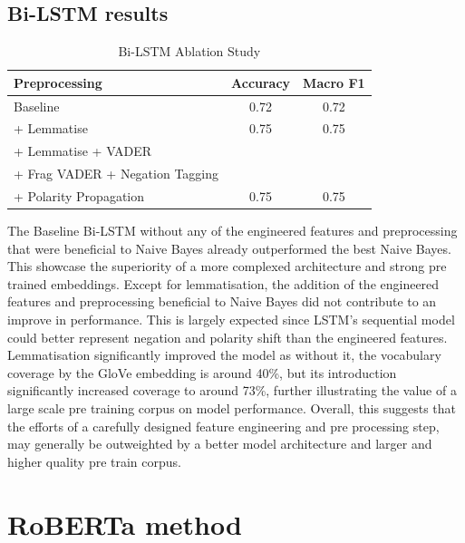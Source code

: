 \documentclass[11pt]{article}
\begin{document}
\subsection{Bi-LSTM results}

\begin{table}[h]
\centering
\small
\renewcommand{\arraystretch}{1.2}
\begin{tabular}{p{4.5cm} c c}
\hline
\textbf{Preprocessing} & \textbf{Accuracy} & \textbf{Macro F1} \\
\hline
Baseline & 0.72 & 0.72 \\
\hline
+ Lemmatise                 & 0.75 & 0.75 \\
\hline
+ Lemmatise + VADER         &      & \\
\quad + Frag VADER + Negation Tagging      &      & \\
\quad + Polarity Propagation                 & 0.75 & 0.75 \\
\hline
\end{tabular}
\caption{Bi-LSTM Ablation Study}
\label{tab:lstm_ablation} 
\end{table}

The Baseline Bi-LSTM without any of the engineered features and preprocessing that were beneficial to Naive Bayes already outperformed the best Naive Bayes.
This showcase the superiority of a more complexed architecture and strong pre trained embeddings. Except for lemmatisation, the addition of the engineered features and preprocessing
beneficial to Naive Bayes did not contribute to an improve in performance. This is largely expected since LSTM's sequential model could better represent negation and polarity shift than the engineered features.
Lemmatisation significantly improved the model as without it, the vocabulary coverage by the GloVe embedding is around 40\%, but its introduction significantly increased coverage to around 73\%, further illustrating the value of a large scale pre training corpus on model performance.
Overall, this suggests that the efforts of a carefully designed feature engineering and pre processing step, may generally be outweighted by a better model architecture and larger and higher quality pre train corpus.

\section{RoBERTa method}
\end{document}

